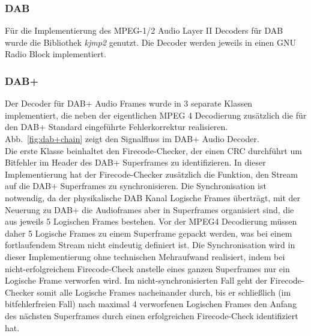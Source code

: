 \subsubsection{DAB}
Für die Implementierung des MPEG-1/2 Audio Layer II Decoders für DAB wurde die Bibliothek \textit{kjmp2}  genutzt. Die Decoder werden jeweils in einen GNU Radio Block implementiert.\\
\subsubsection{DAB+}
Der Decoder für DAB+ Audio Frames wurde in 3 separate Klassen implementiert, die neben der eigentlichen MPEG 4 Decodierung zusätzlich die für den DAB+ Standard eingeführte Fehlerkorrektur realisieren. Abb.~\ref{fig:dab+chain} zeigt den Signalfluss im DAB+ Audio Decoder.\\
Die erste Klasse beinhaltet den Firecode-Checker, der einen CRC durchführt um Bitfehler im Header des DAB+ Superframes zu identifizieren. In dieser Implementierung hat der Firecode-Checker zusätzlich die Funktion, den Stream auf die DAB+ Superframes zu synchronisieren. Die Synchronisation ist notwendig, da der physikalische DAB Kanal Logische Frames überträgt, mit der Neuerung zu DAB+ die Audioframes aber in Superframes organisiert sind, die aus jeweils 5 Logischen Frames bestehen. Vor der MPEG4 Decodierung müssen daher 5 Logische Frames zu einem Superframe gepackt werden, was bei einem fortlaufendem Stream nicht eindeutig definiert ist. Die Synchronisation wird in dieser Implementierung ohne technischen Mehraufwand realisiert, indem bei nicht-erfolgreichem Firecode-Check anstelle eines ganzen Superframes nur ein Logische Frame verworfen wird. Im nicht-synchronisierten Fall geht der Firecode-Checker somit alle Logische Frames nacheinander durch, bis er schließlich (im bitfehlerfreien Fall) nach maximal 4 verworfenen Logischen Frames den Anfang des nächsten Superframes durch einen erfolgreichen Firecode-Check identifiziert hat.\\

